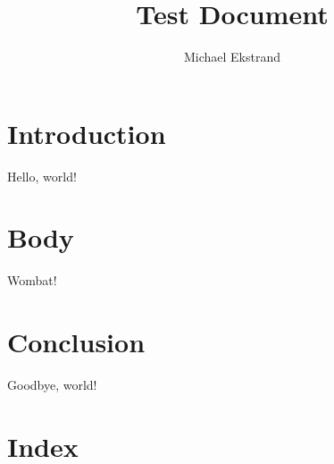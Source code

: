 \documentclass[12pt,letterpaper]{article}
\title{Test Document}
\author{Michael Ekstrand}
\begin{document}
\maketitle

\section{Introduction}
Hello, world!

\section{Body}
Wombat!

\section{Conclusion}
Goodbye, world!

\section{Index}
\printindex
\end{document}
